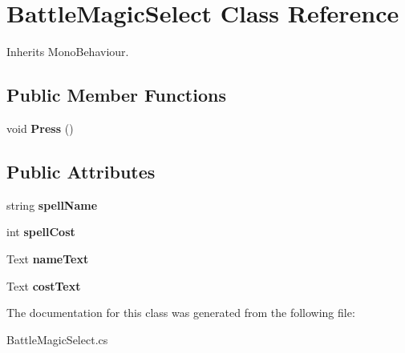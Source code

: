 \hypertarget{class_battle_magic_select}{}\section{Battle\+Magic\+Select Class Reference}
\label{class_battle_magic_select}


Inherits Mono\+Behaviour.

\subsection*{Public Member Functions}
\begin{DoxyCompactItemize}
\item 
\mbox{\label{class_battle_magic_select_a5bcf89edba7b8c8028741a775a2d9154}} 
void {\bfseries Press} ()
\end{DoxyCompactItemize}
\subsection*{Public Attributes}
\begin{DoxyCompactItemize}
\item 
\mbox{\label{class_battle_magic_select_adefe61763876f5500a0b753bb8307c3a}} 
string {\bfseries spell\+Name}
\item 
\mbox{\label{class_battle_magic_select_ae8a7fe1dd4ac9055cc1d1df66ccc3aeb}} 
int {\bfseries spell\+Cost}
\item 
\mbox{\label{class_battle_magic_select_a0165b263f625e53de72e12e6a438efea}} 
Text {\bfseries name\+Text}
\item 
\mbox{\label{class_battle_magic_select_a0db03ca5db329a2713ab4607849a756e}} 
Text {\bfseries cost\+Text}
\end{DoxyCompactItemize}


The documentation for this class was generated from the following file\+:\begin{DoxyCompactItemize}
\item 
Battle\+Magic\+Select.\+cs\end{DoxyCompactItemize}
